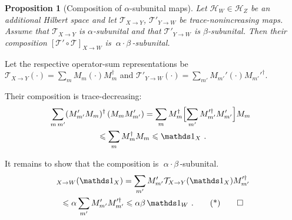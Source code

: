 \documentclass[10pt,letterpaper]{article}
\theoremstyle{plain}
\newtheorem{prop}[thm]{Proposition}
\def\Hs{\mathscr{H}}%
\newenvironment{myproof}[1][\proofname]{%
  \color{prooftextcolor} \footnotesize \proof[\itshape #1]\hspace*{1.2mm}%
}{\endproof}
\begin{document}
\begin{prop}[Composition of $\alpha$-subunital maps]
  \label{prop:CompositionOfAlphaSubunitalMaps}
  Let $\Hs_W\in\Hs_Z$ be an additional Hilbert space and let $\mathcal{T}_{X\rightarrow Y}$,
  $\mathcal{T}'_{Y\rightarrow W}$ be trace-nonincreasing maps. Assume that $\mathcal{T}_{X\rightarrow Y}$ is
  $\alpha$-subunital and that $\mathcal{T}'_{Y\rightarrow W}$ is $\beta$-subunital. Then their composition
  $\left[\mathcal{T}'\circ\mathcal{T}\right]_{X\rightarrow W}$ is $\:\alpha\cdot\beta\,$-subunital.
\end{prop}
\begin{myproof}[Proof of Prop.~\ref{prop:CompositionOfAlphaSubunitalMaps}]
  Let the respective operator-sum representations be
  $\mathcal{T}_{X\rightarrow Y}(\cdot) = \sum_m M_m \left(\cdot\right) M_m^\dagger$ and
  $\mathcal{T}'_{Y\rightarrow W}(\cdot) = \sum_{m'} M_{m'}' \left(\cdot\right) M_{m'}'^\dagger$.

  Their composition is trace-decreasing:
  \begin{multline*}
    \hspace*{-2mm}\sum_{m\,m'} (M_{m'}' M_m)^\dagger \, (M_m M_{m'}')
    = \sum_m M_m^\dagger \Bigl[ \sum_{m'} M_{m'}'^\dagger M_{m'}' \Bigr] M_m \\
    \leqslant \sum_m M_m^\dagger M_m
    \leqslant \Ident_X\ .
  \end{multline*}

  It remains to show that the composition is $\;\alpha\cdot\beta\,$-subunital.
  \begin{multline*}
    [\mathcal{T}'\circ\mathcal{T}]_{X\rightarrow W}(\Ident_X)
    = \sum_{m'} M_{m'}' \mathcal{T}_{X\rightarrow Y}(\Ident_X) M_{m'}'^\dagger \\
    \leqslant \alpha \sum_{m'} M_{m'}' M_{m'}'^\dagger \leqslant \alpha\beta\,\Ident_W\ . \tag*\qedhere
  \end{multline*}
\end{myproof}
\end{document}
